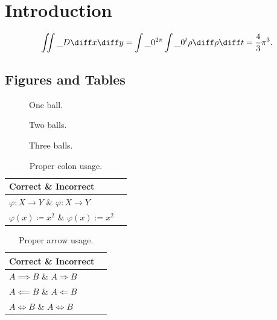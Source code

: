 \chapter{Introduction}
\label{sec:intro}

\kant[4] %

\begin{equation}
    \iint\_D \diff x \diff y
    =
    \int\_0^{2\pi} \int\_0^t \rho \diff \rho \diff t
    =
    \frac{4}{3} \pi^3.
\end{equation}

\section{Figures and Tables}

\begin{figure}[htbp]
    \centering
    
    \caption[One ball]{One ball.}
\end{figure}

\begin{figure}[thbp]
    \centering
    
    \caption[Two balls]{Two balls.}
\end{figure}

\begin{figure}[hbp]
    \centering
    \caption[Three balls]{Three balls.}
\end{figure}

\kant[5-6] %

\begin{table}[htbp]
    \centering
    \begin{tabular}{@{}ll@{}}
        \toprule
        \textbf{Correct}               \& \textbf{Incorrect}      \\
        \midrule
        \( \varphi \colon X \to Y \)   \& \( \varphi : X \to Y \) \\[0.5ex]
        \( \varphi(x) \coloneqq x^2 \) \& \( \varphi(x) := x^2 \) \\
        \bottomrule
    \end{tabular}
    \caption[Colons]{Proper colon usage.}
\end{table}

\begin{table}[htbp]
    \centering
    \begin{tabular}{@{}ll@{}}
        \toprule
        \textbf{Correct}     \& \textbf{Incorrect}         \\
        \midrule
        \( A \implies B \)   \& \( A \Rightarrow B \)      \\
        \( A \impliedby B \) \& \( A \Leftarrow B \)       \\
        \( A \iff B \)       \& \( A \Leftrightarrow B \)  \\
        \bottomrule
    \end{tabular}
    \caption[Arrows]{Proper arrow usage.}
\end{table}

